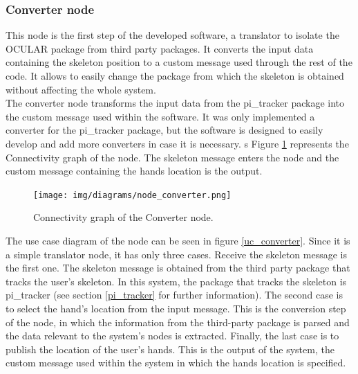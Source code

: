 \newpage

\subsubsection{Converter node}
		\label{converter}

	This node is the first step of the developed software, a translator to isolate the OCULAR package from third party packages. 
	It converts the input data containing the skeleton position to a custom message used through the rest of the code. 
	It allows to easily change the package from which the skeleton is obtained without affecting the whole system. 
	\\

	The converter node transforms the input data from the pi\_tracker package into the custom message used within the software. 
	It was only implemented a converter for the pi\_tracker package, but the software is designed to easily develop and add more converters in case it is necessary. s
	Figure \ref{converter_graph} represents the Connectivity graph of the node. 
	The skeleton message enters the node and the custom message containing the hands location is the output. 

	\vspace{0.5cm}
	\begin{figure}[H]
			\centering
			\texttt{[image: img/diagrams/node\_converter.png]}
			\caption[Converter node I/O]{Connectivity graph of the Converter node.}		
			\label{converter_graph}
		\end{figure}

	The use case diagram of the node can be seen in figure \ref{uc_converter}. 
	Since it is a simple translator node, it has only three cases. 
	Receive the skeleton message is the first one. 
	The skeleton message is obtained from the third party package that tracks the user's skeleton.
	In this system, the package that tracks the skeleton is pi\_tracker (see section \ref{pi_tracker} for further information). 
	The second case is to select the hand's location from the input message. 
	This is the conversion step of the node, in which the information from the third-party package is parsed and the data relevant to the system's nodes is extracted. 
	Finally, the last case is to publish the location of the user's hands. 
	This is the output of the system, the custom message used within the system in which the hands location is specified. 
	\vspace{0.5cm}


